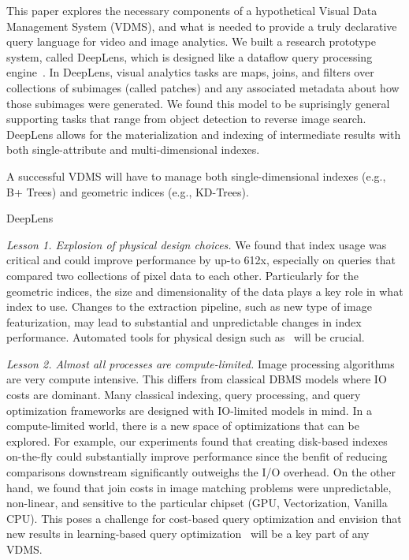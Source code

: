 This paper explores the necessary components of a hypothetical Visual Data Management System (VDMS), and what is needed to provide a truly declarative query language for video and image analytics.
We built a research prototype system, called \textsf{DeepLens}, which is designed like a dataflow query processing engine~\cite{graefe1994volcano}.
In \textsf{DeepLens}, visual analytics tasks are maps, joins, and filters over collections of subimages (called patches) and any associated metadata about how those subimages were generated.
We found this model to be suprisingly general supporting tasks that range from object detection to reverse image search.
\textsf{DeepLens} allows for the materialization and indexing of intermediate results with both single-attribute and multi-dimensional indexes.





A successful VDMS will have to manage both single-dimensional indexes (e.g., B+ Trees) and geometric indices (e.g., KD-Trees).









\textsf{DeepLens}





\vspace{0.75em} \noindent \emph{Lesson 1. Explosion of physical design choices. }  We found that index usage was critical and could improve performance by up-to 612x, especially on queries that compared two collections of pixel data to each other.
Particularly for the geometric indices, the size and dimensionality of the data plays a key role in what index to use. Changes to the extraction pipeline, such as new type of image featurization, may lead to substantial and unpredictable changes in index performance.
Automated tools for physical design such as~\cite{sharma2018case,pavlo2017self} will be crucial.

\vspace{0.5em} \noindent \emph{Lesson 2. Almost all processes are compute-limited. }
Image processing algorithms are very compute intensive. This differs from classical DBMS models where IO costs are dominant. 
Many classical indexing, query processing, and query optimization frameworks are designed with IO-limited models in mind.
In a compute-limited world, there is a new space of optimizations that can be explored.
For example, our experiments found that creating disk-based indexes on-the-fly could substantially improve performance since the benfit of reducing comparisons downstream significantly outweighs the I/O overhead.
On the other hand, we found that join costs in image matching problems were unpredictable, non-linear, and sensitive to the particular chipset (GPU, Vectorization, Vanilla CPU).
This poses a challenge for cost-based query optimization and envision that new results in learning-based query optimization~\cite{kaftan2018cuttlefish,krishnan2018deeprljoins} will be a key part of any VDMS.

